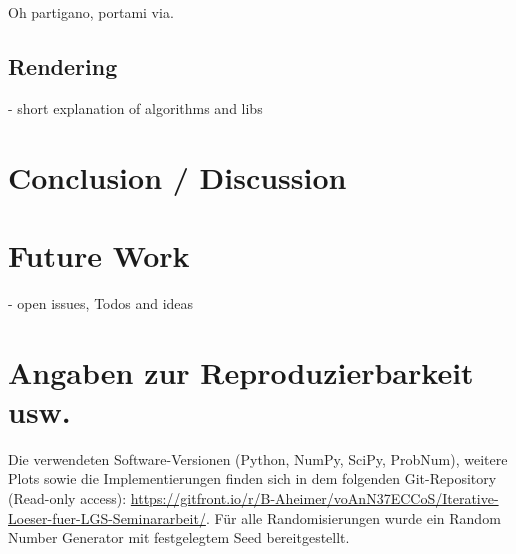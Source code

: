 \documentclass[a4paper,12pt]{llncs}
\numberwithin{equation}{section}
\begin{document}
\begin{corollary}\label{cor:steep}
  Oh partigano, portami via.
\end{corollary}
%

\subsection{Rendering}

- short explanation of algorithms and libs 

%
\section{Conclusion / Discussion}
%
\section{Future Work}
- open issues, Todos and ideas
%
\appendix
%
\section{Angaben zur Reproduzierbarkeit usw.}
\label{Anhang}
Die verwendeten Software-Versionen (Python, NumPy, SciPy, ProbNum), weitere Plots sowie die Implementierungen finden sich in dem folgenden Git-Repository (Read-only access):
\url{https://gitfront.io/r/B-Aheimer/voAnN37ECCoS/Iterative-Loeser-fuer-LGS-Seminararbeit/}.
Für alle Randomisierungen wurde ein Random Number Generator mit festgelegtem Seed bereitgestellt.
\end{document}
